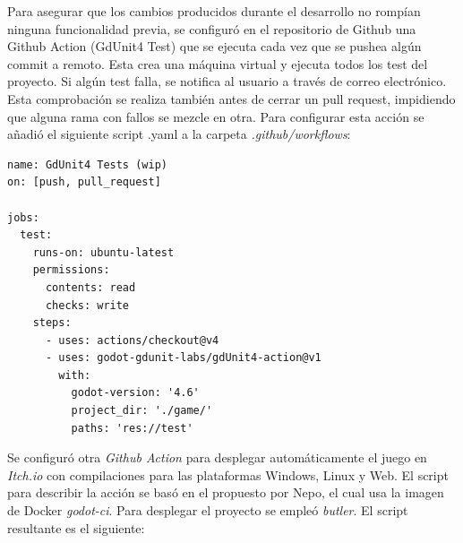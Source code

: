 
Para asegurar que los cambios producidos durante el desarrollo no rompían ninguna funcionalidad previa, se configuró en el repositorio de Github una Github Action (GdUnit4 Test\cite{gdunit4-action}) que se ejecuta cada vez que se pushea algún commit a remoto. Esta crea una máquina virtual y ejecuta todos los test del proyecto. Si algún test falla, se notifica al usuario a través de correo electrónico. Esta comprobación se realiza también antes de cerrar un pull request, impidiendo que alguna rama con fallos se mezcle en otra. Para configurar esta acción se añadió el siguiente script .yaml a la carpeta \textit{.github/workflows}:

\begin{verbatim}
name: GdUnit4 Tests (wip)
on: [push, pull_request]

jobs:
  test:
    runs-on: ubuntu-latest
    permissions:
      contents: read
      checks: write
    steps:
      - uses: actions/checkout@v4
      - uses: godot-gdunit-labs/gdUnit4-action@v1
        with:
          godot-version: '4.6'
          project_dir: './game/'
          paths: 'res://test'
\end{verbatim}

Se configuró otra \textit{Github Action} para desplegar automáticamente el juego en \textit{Itch.io} con compilaciones para las plataformas Windows, Linux y Web. El script para describir la acción se basó en el propuesto por Nepo\cite{nepo-ci}, el cual usa la imagen de Docker \textit{godot-ci}\cite{godot-ci}. Para desplegar el proyecto se empleó \textit{butler}\cite{butler}. El script resultante es el siguiente:

